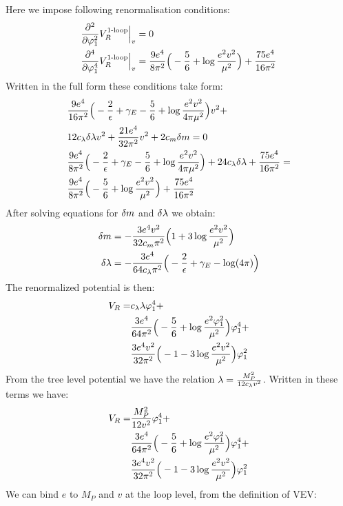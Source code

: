Here we impose following renormalisation conditions:
\begin{align}
\frac{\partial^2 }{\partial \varphi_1^2}V_R^{\textrm{1-loop}}\Big|_{v} &= 0 \\
\frac{\partial^4 }{\partial \varphi_1^4}V_R^{\textrm{1-loop}}\Big|_{v} &= \frac{9e^4}{8\pi^2}\Big(-\frac{5}{6}+\log\frac{e^2
v^2}{\mu^2}\Big)
+\frac{75e^4}{16\pi^2}
\end{align}
Written in the full form these conditions take form:
\begin{align}
&\frac{9e^4}{16\pi^2}\Big(-\frac{2}{\epsilon}+\gamma_E-\frac{5}{6}+\log\frac{e^2
v^2}{4\pi\mu^2}\Big)v^2+ \notag\\
& 12c_\lambda\delta\lambda v^2+\frac{21e^4}{32\pi^2}v^2+2c_m\delta m = 0 \\
&\frac{9e^4}{8\pi^2}\Big(-\frac{2}{\epsilon}+\gamma_E-\frac{5}{6}+\log\frac{e^2v^2}{4\pi\mu^2}\Big)+
24c_\lambda\delta\lambda+\frac{75e^4}{16\pi^2} = \notag \\
&\frac{9e^4}{8\pi^2}\Big(-\frac{5}{6}+\log\frac{e^2v^2}{\mu^2}\Big)+\frac{75e^4}{16\pi^2}
\end{align}
After solving equations for $\delta m$ and $\delta\lambda$ we obtain:
\begin{align}
\delta m &= -\frac{3e^4v^2}{32c_m\pi^2}\Big(1+3
\log\frac{e^2v^2}{\mu^2}\Big) \\
\delta\lambda &= -\frac{3e^4}{64c_\lambda\pi^2}\Big(-\frac{2}{\epsilon}+\gamma_E-\log(4\pi)\Big)
\end{align}
The renormalized potential is then:
\begin{align}
V_R = &c_\lambda\lambda\varphi_1^4 + \notag \\ 
&\frac{3e^4}{64\pi^2}\Big(-\frac{5}{6}+\log\frac{e^2\varphi_1^2}{\mu^2}\Big)\varphi_1^4+ \notag\\
&\frac{3e^4v^2}{32\pi^2}\Big(-1-3\log\frac{e^2v^2}{\mu^2}\Big)\varphi_1^2
\end{align}
From the tree level potential we have the relation $\lambda = \frac{M_P^2}{12c_\lambda v^2}$. 
Written in these terms we have:
\begin{align}
V_R = &\frac{M_P^2}{12v^2}\varphi_1^4 + \notag \\ 
&\frac{3e^4}{64\pi^2}\Big(-\frac{5}{6}+\log\frac{e^2\varphi_1^2}{\mu^2}\Big)\varphi_1^4+ \notag\\
&\frac{3e^4v^2}{32\pi^2}\Big(-1-3\log\frac{e^2v^2}{\mu^2}\Big)\varphi_1^2
\end{align}
We can bind $e$ to $M_P$ and $v$ at the loop level, from the definition of VEV:
